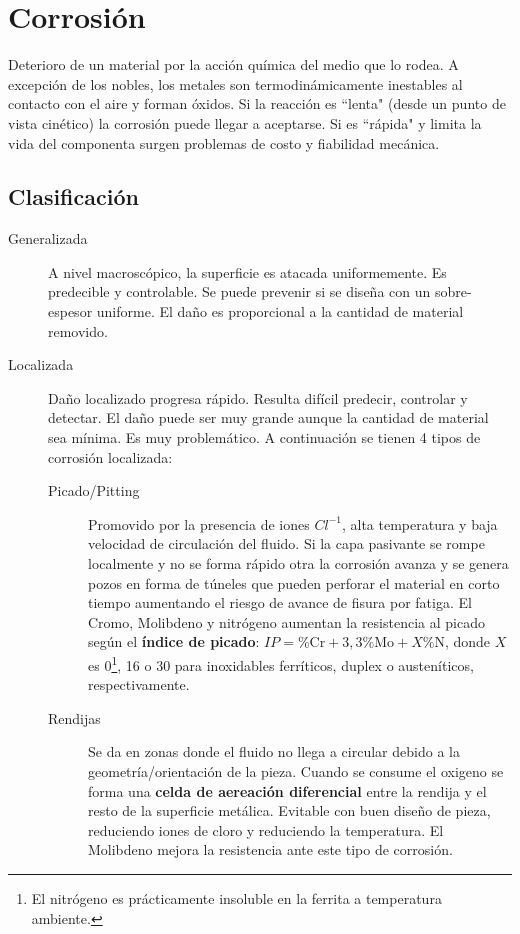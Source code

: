 \section{Corrosión}
Deterioro de un material por la acción química del medio que lo rodea. A excepción de los nobles, los metales son termodinámicamente inestables al contacto con el aire y forman óxidos. Si la reacción es ``lenta"{} (desde un punto de vista cinético) la corrosión puede llegar a aceptarse. Si es ``rápida"{} y limita la vida del componenta surgen problemas de costo y fiabilidad mecánica.

\subsection{Clasificación}
\begin{description}
	\item[Generalizada] A nivel macroscópico, la superficie es atacada uniformemente. Es predecible y controlable. Se puede prevenir si se diseña con un sobre-espesor uniforme. El daño es proporcional a la cantidad de material removido.
	\item[Localizada] Daño localizado progresa rápido. Resulta difícil predecir, controlar y detectar. El daño puede ser muy grande aunque la cantidad de material sea mínima. Es muy problemático. A continuación se tienen 4 tipos de corrosión localizada:
	      \begin{description}
		      \item[Picado/Pitting] Promovido por la presencia de iones $Cl^{-1}$, alta temperatura y baja velocidad de circulación del fluido. Si la capa pasivante se rompe localmente y no se forma rápido otra la corrosión avanza y se genera pozos en forma de túneles que pueden perforar el material en corto tiempo aumentando el riesgo de avance de fisura por fatiga. El Cromo, Molibdeno y nitrógeno aumentan la resistencia al picado según el \textbf{índice de picado}: $IP=\% \textrm{Cr} + 3,3\% \textrm{Mo} + X \%\textrm{N}$,  donde $X$ es 0\footnote{El nitrógeno es prácticamente insoluble en la ferrita a temperatura ambiente.}, 16 o 30 para inoxidables ferríticos, duplex o austeníticos, respectivamente. 
		      \item[Rendijas] Se da en zonas donde el fluido no llega a circular debido a la geometría/orientación de la pieza. Cuando se consume el oxigeno se forma una \textbf{celda de aereación diferencial} entre la rendija y el resto de la superficie metálica. Evitable con buen diseño de pieza, reduciendo iones de cloro y reduciendo la temperatura. El Molibdeno mejora la resistencia ante este tipo de corrosión.

\end{description}
\end{description}
